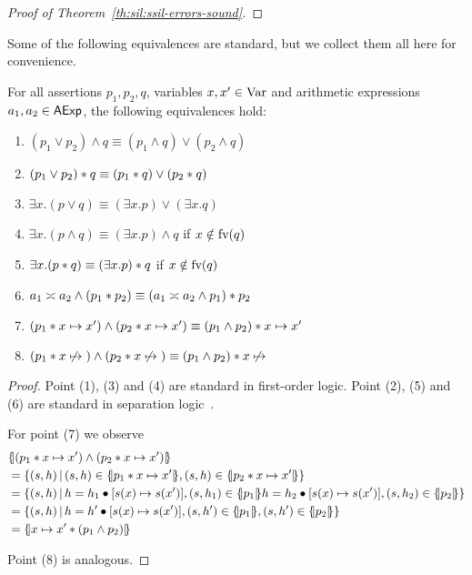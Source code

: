 \begin{proof}[Proof of Theorem~\ref{th:sil:ssil-errors-sound}]
\end{proof}

Some of the following equivalences are standard, but we collect them all here for convenience.
\begin{lemma}\label{lmm:app:asl-equivalences}
	For all assertions $p_1, p_2, q$, variables $x, x' \in \text{Var}$ and arithmetic expressions $a_1, a_2 \in \mathsf{AExp}$, the following equivalences hold:
	\begin{enumerate}
		\item $(p_1 \lor p_2) \land q \equiv (p_1 \land q) \lor (p_2 \land q)$
		\item $(p_1 \lor p_2) * q \equiv (p_1 * q) \lor (p_2 * q)$
		\item $\exists x. (p \lor q) \equiv (\exists x. p) \lor (\exists x. q)$
		\item $\exists x. (p \land q) \equiv (\exists x. p) \land q$ \quad if $x \notin \text{fv}(q)$
		\item $\exists x. (p * q) \equiv (\exists x. p) * q$ \quad if $x \notin \text{fv}(q)$
		\item $a_1 \asymp a_2 \land (p_1 * p_2) \equiv (a_1 \asymp a_2 \land p_1) * p_2$
		\item $(p_1 * x \mapsto x') \land (p_2 * x \mapsto x') \equiv (p_1 \land p_2) * x \mapsto x'$
		\item $(p_1 * x \not\mapsto{}) \land (p_2 * x \not\mapsto{}) \equiv (p_1 \land p_2) * x \not\mapsto{}$
	\end{enumerate}
\end{lemma}
\begin{proof}
	Point (1), (3) and (4) are standard in first-order logic. Point (2), (5) and (6) are standard in separation logic~\cite{Reynolds02}.

	For point (7) we observe
	\begin{align*}
		 & \asldenot{(p_1 \andsep x \mapsto x') \land (p_2 \andsep x \mapsto x')}                                                                                             \\
		 & =\{ (s, h) \svert (s, h) \in \asldenot{p_1 \andsep x \mapsto x'}, (s, h) \in \asldenot{p_2 \andsep x \mapsto x'} \}                                                \\
		 & =\lbrace (s, h) \svert h = h_1 \bullet [s(x) \mapsto s(x')], (s, h_1) \in \asldenot{p_1} h = h_2 \bullet [s(x) \mapsto s(x')], (s, h_2) \in \asldenot{p_2} \rbrace \\
		 & =\{ (s, h) \svert h = h' \bullet [s(x) \mapsto s(x')], (s, h') \in \asldenot{p_1}, (s, h') \in \asldenot{p_2}  \}                                                  \\
		 & =\asldenot{x \mapsto x' \andsep (p_1 \land p_2)}
	\end{align*}

	Point (8) is analogous.
\end{proof}

